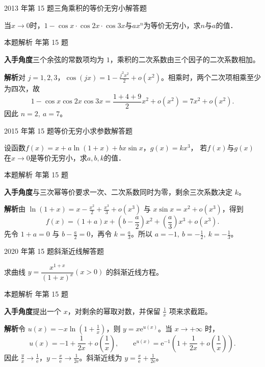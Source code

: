 \documentclass[UTF8,zihao=-4,fontset=fandol]{ctexart}
\newcommand{\QuestionPage}[6]{%
  \par\noindent\begin{minipage}{\linewidth}
  \raggedright
  {\small\textcolor{black!60}{#3\quad #5}\hfill\textcolor{accent}{#2}}\par\smallskip}
\newcommand{\QuestionEnd}{\end{minipage}\par\medskip}
\newcommand{\QuestionPage}[6]{%
  \clearpage
  {\small\textcolor{accent}{#1\hfill #2}}\par\medskip
  {\small\textcolor{black!60}{#3\quad #5\hfill #6}}\par\vspace{9bp}}
\newcommand{\QuestionEnd}{}
\newenvironment{QuestionSolution}[1]{%
  \clearpage
  {\small\textcolor{black!60}{本题解析\quad #1}}\par\medskip
}{\par\clearpage}
\begin{document}
\QuestionPage{1.4 无穷小量与无穷大量}{解答题}{2013 年第 15 题}{2}{三角乘积的等价无穷小}{037 / 234}
当$x \to 0$时，$1 - \cos x \cdot \cos 2x \cdot \cos 3x$与$ax^n$为等价无穷小，求$n$与$a$的值．
\QuestionEnd

\begin{QuestionSolution}{2013 年第 15 题}
\textbf{入手角度}\quad 三个余弦的常数项均为 \(1\)，乘积的二次系数由三个因子的二次系数相加。

\textbf{解析}\quad 对 \(j=1,2,3\)，\(\cos(jx)=1-\frac{j^2x^2}{2}+o(x^2)\)。相乘时，两个二次项相乘至少为四次，故
\[
1-\cos x\cos 2x\cos 3x
=\frac{1+4+9}2x^2+o(x^2)=7x^2+o(x^2).
\]
因此 \(\boxed{n=2,\ a=7}\)。
\end{QuestionSolution}

\QuestionPage{1.4 无穷小量与无穷大量}{解答题}{2015 年第 15 题}{2}{等价无穷小求参数}{038 / 234}
设函数$f(x) = x + a\ln(1 + x) + bx\sin x$，$g(x) = kx^3$，
若$f(x)$与$g(x)$在$x \to 0$是等价无穷小，求$a,b,k$的值．
\QuestionEnd

\begin{QuestionSolution}{2015 年第 15 题}
\textbf{入手角度}\quad 与三次幂等价要求一次、二次系数同时为零，剩余三次系数决定 \(k\)。

\textbf{解析}\quad 由 \(\ln(1+x)=x-\frac{x^2}{2}+\frac{x^3}{3}+o(x^3)\) 与 \(x\sin x=x^2+o(x^3)\)，得到
\[
f(x)=(1+a)x+(b-\frac{a}{2})x^2+(\frac{a}{3})x^3+o(x^3).
\]
先令 \(1+a=0\) 与 \(b-\frac{a}{2}=0\)，再令 \(k=\frac{a}{3}\)。所以 \(\boxed{a=-1,\ b=-\frac{1}{2},\ k=-\frac{1}{3}}\)。
\end{QuestionSolution}

\QuestionPage{1.4 无穷小量与无穷大量}{解答题}{2020 年第 15 题}{2}{斜渐近线}{039 / 234}
求曲线 \(y = \dfrac{x^{1+x}}{\left( 1+x \right)^{x}} \left( x>0 \right)\) 的斜渐近线方程。
\QuestionEnd

\begin{QuestionSolution}{2020 年第 15 题}
\textbf{入手角度}\quad 提出一个 \(x\)，对剩余的幂取对数，并保留 \(\frac{1}{x}\) 项来求截距。

\textbf{解析}\quad 令 \(u(x)=-x\ln(1+\frac{1}{x})\)，则 \(y=x\mathrm{e}^{u(x)}\)。当 \(x\to+\infty\) 时，
\[
u(x)=-1+\frac{1}{2x}+o(\frac{1}{x}),
\qquad
\mathrm{e}^{u(x)}=\mathrm{e}^{-1}\left(1+\frac{1}{2x}+o(\frac{1}{x})\right).
\]
因此 \(\frac{y}{x}\to\frac{1}{\mathrm{e}}\)，\(y-\frac{x}{\mathrm{e}}\to\frac{1}{2\mathrm{e}}\)。斜渐近线为 \(\boxed{y=\frac{x}{\mathrm{e}}+\frac{1}{2\mathrm{e}}}\)。
\end{QuestionSolution}
\end{document}
